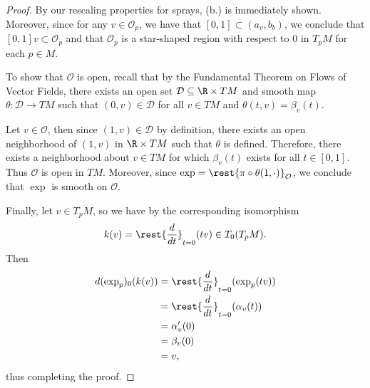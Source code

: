 \begin{proof}
By our rescaling properties for sprays, (b.) is immediately shown.  Moreover, since for any $v\in\mathcal{O}_p$, we have that $[0,1]\subset(a_v,b_b)$, we conclude that $[0,1]v\subset\mathcal{O}_p$ and that $\mathcal{O}_p$ is a star-shaped region with respect to $0$ in $T_pM$ for each $p\in M$.

To show that $\mathcal{O}$ is open, recall that by the Fundamental Theorem on Flows of Vector Fields, there exists an open set $\mathcal{D}\subseteq\R\times TM$ and smooth map $\theta:\mathcal{D}\to TM$ such that $(0,v)\in\mathcal{D}$ for all $v\in TM$ and $\theta(t,v)=\beta_v(t)$.

Let $v\in\mathcal{O}$, then since $(1,v)\in\mathcal{D}$ by definition, there exists an open neighborhood of $(1,v)$ in $\R\times TM$ such that $\theta$ is defined.  Therefore, there exists a neighborhood about $v\in TM$ for which $\beta_v(t)$ exists for all $t\in[0,1]$.  Thus $\mathcal{O}$ is open in $TM$.  Moreover, since $\exp=\rest{\pi\circ\theta(1,\cdot)}_{\mathcal{O}}$, we conclude that $\exp$ is smooth on $\mathcal{O}$.

Finally, let $v\in T_pM$, so we have by the corresponding isomorphism
$$k(v)=\rest{\frac{d}{dt}}_{t=0}(tv)\in T_0(T_pM).$$
Then
\begin{align*}
	d(\exp_p)_0(k(v))&=\rest{\frac{d}{dt}}_{t=0}(\exp_p(tv))\\
	&=\rest{\frac{d}{dt}}_{t=0}(\alpha_v(t))\\
	&=\alpha_v'(0)\\
	&=\beta_v(0)\\
	&=v,
\end{align*}
thus completing the proof.
\end{proof}

















